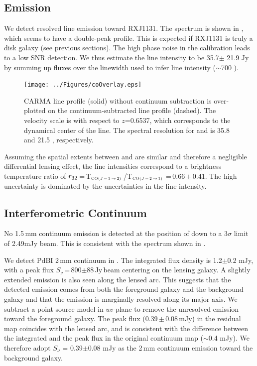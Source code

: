 \documentclass[]{emulateapj}
\begin{document}
\subsection{\cco Emission} %
We detect resolved \cco line emission toward RXJ1131. The spectrum is shown in
, which seems to have a double-peak profile.
This is expected if RXJ1131 is truly a disk galaxy (see previous
sections). The high phase noise in the calibration leads to a low SNR
detection. We thus estimate the line intensity to be
35.7$\pm$ 21.9 Jy\,\kms by summing up fluxes over the
linewidth used to infer \bco line intensity ($\sim$700 \kms).

\begin{figure}[!Htbp]
\centering
\texttt{[image: ../Figures/coOverlay.eps]}
\caption{CARMA \cco line profile (solid) without continuum subtraction is
over-plotted on the continuum-subtracted \bco line profile (dashed).
The velocity scale is with respect to $z$=0.6537, which corresponds to the
dynamical center of the \bco line. The spectral resolution for \cco and \bco
is 35.8 \kms and 21.5 \kms, respectively.
 \label{fig:co32spec}}
\end{figure}

Assuming the spatial extents between \bco and \cco are similar and therefore
a negligible differential lensing effect, the line intensities
correspond to a brightness temperature ratio of
$r_{\rm 32}$\,=\,T$_{\tiny \mbox{CO($J$\,=\,3\,$\rightarrow$\,2) }}$/T$_{\tiny \mbox{CO($J$\,=\,2\,$\rightarrow$\,1) }}$\,=\,0.66\,$\pm$\,0.41.
The high uncertainty is dominated by the uncertainties in the \cco line
intensity.

\subsection{Interferometric Continuum} %
No 1.5\,mm continuum emission is detected at the position of \cco
down to a 3$\sigma$ limit of 2.49mJy beam\pmOne.
This is consistent with the spectrum shown in .

We detect PdBI 2\,mm continuum in . The integrated flux density is
1.2$\pm$0.2 mJy, with a peak flux
$S_\nu$\,=\,800$\pm$88\,\micron Jy\,beam\pmOne
centering on the lensing galaxy. A slightly extended emission is also seen
along the lensed arc. This suggests that the detected emission comes from
both the foreground galaxy and the background galaxy and that the
emission is marginally resolved along its major axis.
We subtract a point source model in $uv$-plane to remove the unresolved
emission toward the foreground galaxy. The peak flux (0.39\,$\pm$\,0.08\,mJy)
in the residual map coincides with the lensed arc, and is consistent with
the difference between the integrated and the peak flux in the
original continuum map ($\sim$0.4 mJy). We therefore adopt
$S_\nu$ = 0.39$\pm$0.08 mJy as the 2\,mm continuum emission toward
the background galaxy.
\end{document}
